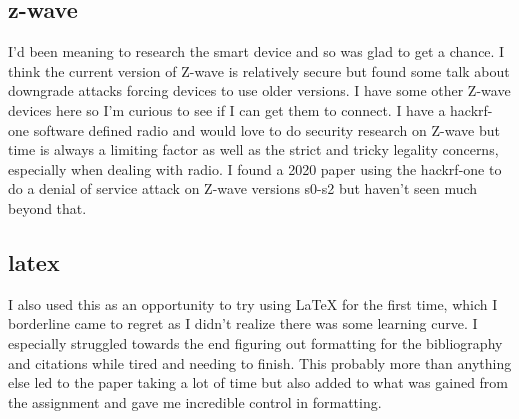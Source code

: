 \documentclass[10pt]{article}
\begin{document}
\subsection*{z-wave}
I'd been meaning to research the smart device and so was glad to get a chance. I think the current version of Z-wave is relatively 
secure but found some talk about downgrade attacks forcing devices to use older versions. I have some other Z-wave devices here so I'm curious to see if I can
get them to connect. I have a hackrf-one software defined radio and would love to do security research on Z-wave but time is always a limiting factor as well
as the strict and tricky legality concerns, especially when dealing with radio. I found a 2020 paper using the hackrf-one to do a denial of service attack
on Z-wave versions s0-s2 but haven't seen much beyond that.

\subsection*{latex}
I also used this as an opportunity to try using LaTeX for the first time, which I borderline came to regret as I didn't realize there was some learning curve. I especially 
struggled towards the end figuring out formatting for the bibliography and citations while tired and needing to finish. This probably more than anything else led to the paper 
taking a lot of time but also added to what was gained from the assignment and gave me incredible control in formatting.
\end{document}
